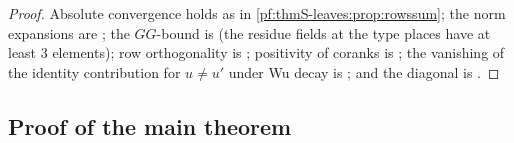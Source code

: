 \begin{proof}
Absolute convergence holds as in \cref{pf:thmS-leaves:prop:rowssum}; the norm expansions are
; the $GG$-bound is  (the residue
fields at the type places have at least $3$ elements); row orthogonality is ; positivity of
coranks is ; the vanishing of the identity contribution for $u\ne u'$ under Wu decay
is ; and the diagonal is .
\end{proof}

\subsection{Proof of the main theorem}\label{pf:thmS-leaves:ss:mainproof}

